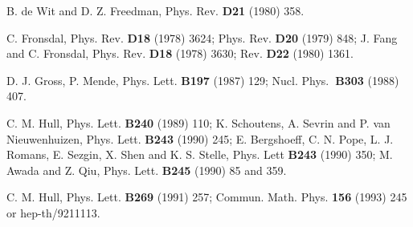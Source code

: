 \documentclass[a4paper,12pt]{article}
\begin{document}
\begin{thebibliography}{99}
  B. de Wit and D. Z. Freedman, Phys. Rev. \textbf{D21}
(1980) 358.

  C. Fronsdal, Phys. Rev. \textbf{D18} (1978) 3624; Phys.
Rev. \textbf{D20} (1979) 848;\newline
J. Fang and C. Fronsdal, Phys. Rev. \textbf{D18} (1978) 3630; Rev. \textbf{%
D22} (1980) 1361.

  D. J. Gross, P. Mende, Phys. Lett. \textbf{B197} (1987)
129; Nucl. Phys.\textbf{\ B303} (1988) 407.

  C. M. Hull, Phys. Lett. \textbf{B240} (1989) 110; \newline
K. Schoutens, A. Sevrin and P. van Nieuwenhuizen, Phys. Lett. \textbf{B243}
(1990) 245; \newline
E. Bergshoeff, C. N. Pope, L. J. Romans, E. Sezgin, X. Shen and K. S.
Stelle, Phys. Lett \textbf{B243} (1990) 350; \newline
M. Awada and Z. Qiu, Phys. Lett. \textbf{B245} (1990) 85 and 359.

  C. M. Hull, Phys. Lett. \textbf{B269} (1991) 257; Commun.
Math. Phys. \textbf{156} (1993) 245 or hep-th/9211113.
\end{thebibliography}
\end{document}
